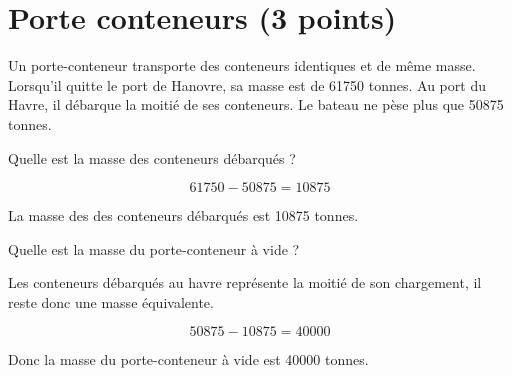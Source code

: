 \section{Porte conteneurs (3 points)}

Un porte-conteneur transporte des conteneurs identiques et de même masse.
Lorsqu'il quitte le port de Hanovre, sa masse est de \num{61750} tonnes.
Au port du Havre, il débarque la moitié de ses conteneurs. Le bateau ne pèse plus que \num{50875} tonnes.

\begin{questions}
	\question[1] Quelle est la masse des conteneurs débarqués ?
	\begin{solution}
		\begin{equation*}
			\num{61750} - \num{50875} = \num{10875}
		\end{equation*}
		
		La masse des des conteneurs débarqués est \num{10875} tonnes.
	\end{solution}

	\question[2] Quelle est la masse du porte-conteneur à vide ?
	
	\begin{solution}
		Les conteneurs débarqués au havre représente la moitié de son chargement, il reste donc une masse équivalente.
		
		\begin{equation*}
			\num{50875} - \num{10875} = \num{40000}
		\end{equation*}
		
		Donc la masse du porte-conteneur à vide est \num{40000} tonnes.
	\end{solution}
\end{questions}